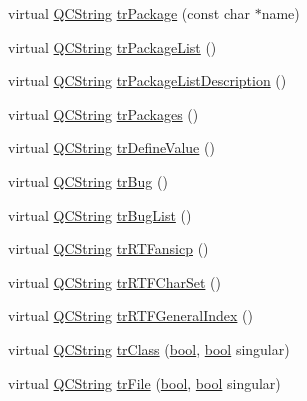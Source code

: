 \begin{DoxyCompactItemize}
\item 
virtual \hyperlink{class_q_c_string}{Q\+C\+String} \hyperlink{class_translator_korean_a3f1264cb70c19c0dc66b421db2d98e6e}{tr\+Package} (const char $\ast$name)
\item 
virtual \hyperlink{class_q_c_string}{Q\+C\+String} \hyperlink{class_translator_korean_a6bfdf51711c757470c119ecc5b5e54ea}{tr\+Package\+List} ()
\item 
virtual \hyperlink{class_q_c_string}{Q\+C\+String} \hyperlink{class_translator_korean_a7f85a138a7e0f37564094905686177f9}{tr\+Package\+List\+Description} ()
\item 
virtual \hyperlink{class_q_c_string}{Q\+C\+String} \hyperlink{class_translator_korean_ace3e33c1989ea0b200ecbcfcb69bb205}{tr\+Packages} ()
\item 
virtual \hyperlink{class_q_c_string}{Q\+C\+String} \hyperlink{class_translator_korean_a4dd19b3883ff980ba96f7c337717e966}{tr\+Define\+Value} ()
\item 
virtual \hyperlink{class_q_c_string}{Q\+C\+String} \hyperlink{class_translator_korean_aebdfc5077da35af0f2c97e3af5b5ad68}{tr\+Bug} ()
\item 
virtual \hyperlink{class_q_c_string}{Q\+C\+String} \hyperlink{class_translator_korean_a0ce4e429855d853b7b88f51380c7f788}{tr\+Bug\+List} ()
\item 
virtual \hyperlink{class_q_c_string}{Q\+C\+String} \hyperlink{class_translator_korean_a9f814151d64327b59b1819e756329d9f}{tr\+R\+T\+Fansicp} ()
\item 
virtual \hyperlink{class_q_c_string}{Q\+C\+String} \hyperlink{class_translator_korean_abc7c0238b498ea5bf2a6c9aeafac207d}{tr\+R\+T\+F\+Char\+Set} ()
\item 
virtual \hyperlink{class_q_c_string}{Q\+C\+String} \hyperlink{class_translator_korean_a65b285ca91229329881bde2ac0febcd2}{tr\+R\+T\+F\+General\+Index} ()
\item 
virtual \hyperlink{class_q_c_string}{Q\+C\+String} \hyperlink{class_translator_korean_a47f5df8924d85212293da8f90b15c38f}{tr\+Class} (\hyperlink{qglobal_8h_a1062901a7428fdd9c7f180f5e01ea056}{bool}, \hyperlink{qglobal_8h_a1062901a7428fdd9c7f180f5e01ea056}{bool} singular)
\item 
virtual \hyperlink{class_q_c_string}{Q\+C\+String} \hyperlink{class_translator_korean_aa4c52e8d32d016b14a77cff015f9c9ee}{tr\+File} (\hyperlink{qglobal_8h_a1062901a7428fdd9c7f180f5e01ea056}{bool}, \hyperlink{qglobal_8h_a1062901a7428fdd9c7f180f5e01ea056}{bool} singular)
\item 

\end{DoxyCompactItemize}
